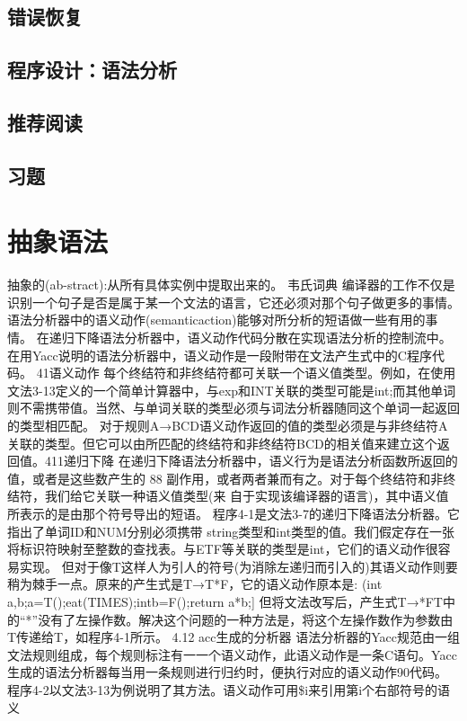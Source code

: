\documentclass[cn,11pt,chinese]{elegantbook}
\begin{document}
\section{错误恢复}

\section{程序设计：语法分析}

\section{推荐阅读}

\section{习题}

\chapter{抽象语法}

抽象的(ab-stract):从所有具体实例中提取出来的。
韦氏词典
编译器的工作不仅是识别一个句子是否是属于某一个文法的语言，它还必须对那个句子做更多的事情。语法分析器中的语义动作(semanticaction)能够对所分析的短语做一些有用的事情。
在递归下降语法分析器中，语义动作代码分散在实现语法分析的控制流中。在用Yacc说明的语法分析器中，语义动作是一段附带在文法产生式中的C程序代码。
41语义动作
每个终结符和非终结符都可关联一个语义值类型。例如，在使用文法3-13定义的一个简单计算器中，与exp和INT关联的类型可能是int;而其他单词则不需携带值。当然、与单词关联的类型必须与词法分析器随同这个单词一起返回的类型相匹配。
对于规则A→BCD语义动作返回的值的类型必须是与非终结符A关联的类型。但它可以由所匹配的终结符和非终结符BCD的相关值来建立这个返回值。411递归下降
在递归下降语法分析器中，语义行为是语法分析函数所返回的值，或者是这些数产生的
88 副作用，或者两者兼而有之。对于每个终结符和非终结符，我们给它关联一种语义值类型(来 
自于实现该编译器的语言)，其中语义值所表示的是由那个符号导出的短语。
程序4-1是文法3-7的递归下降语法分析器。它指出了单词ID和NUM分别必须携带 string类型和int类型的值。我们假定存在一张将标识符映射至整数的查找表。与ETF等关联的类型是int，它们的语义动作很容易实现。
但对于像T这样人为引人的符号(为消除左递归而引入的)其语义动作则要稍为棘手一点。原来的产生式是T→T*F，它的语义动作原本是:
(int a,b;a=T();eat(TIMES);intb=F();return a*b;]
但将文法改写后，产生式T→*FT中的“*”没有了左操作数。解决这个问题的一种方法是，将这个左操作数作为参数由T传递给T，如程序4-1所示。
4.12 acc生成的分析器
语法分析器的Yacc规范由一组文法规则组成，每个规则标注有一一个语义动作，此语义动作是一条C语句。Yacc生成的语法分析器每当用一条规则进行归约时，便执行对应的语义动作90代码。
程序4-2以文法3-13为例说明了其方法。语义动作可用\$i来引用第i个右部符号的语义
\end{document}
